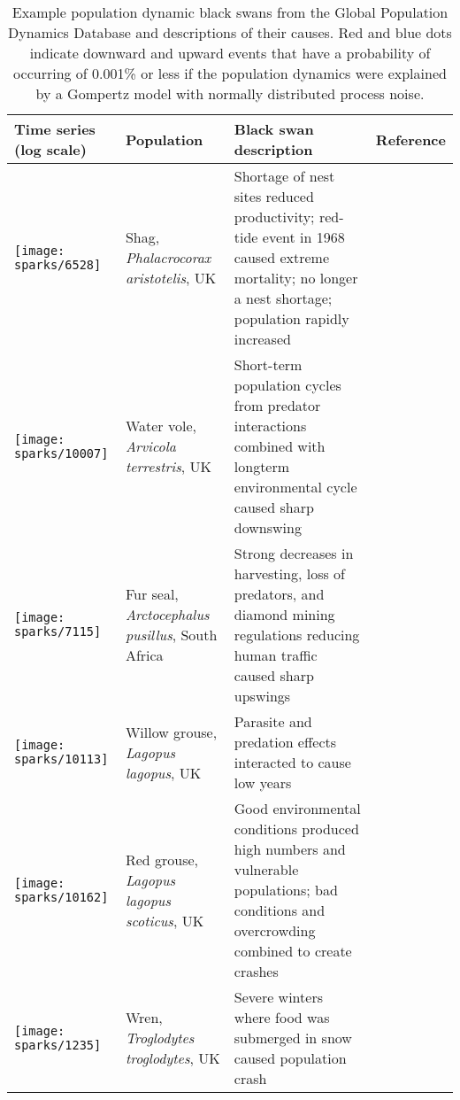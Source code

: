 \documentclass[11pt]{article}
\begin{document}
\begin{small}
\begin{longtable}{>{\RaggedRight}m{2.0cm}>{\RaggedRight}p{3.0cm}>{\RaggedRight}p{7.0cm}>{\RaggedRight}p{2.0cm}}

\caption{Example population dynamic black swans from the Global Population Dynamics Database and descriptions of their causes. Red and blue dots indicate downward and upward events that have a probability of occurring of 0.001\% or less if the population dynamics were explained by a Gompertz model with normally distributed process noise.}\\

\toprule
Time series (log scale) & Population & Black swan description & Reference \\
\midrule

\texttt{[image: sparks/6528]} &
Shag,
\textit{Phalacrocorax aristotelis},
UK &
Shortage of nest sites reduced productivity; red-tide event in 1968 caused extreme mortality; no longer a nest shortage; population rapidly increased &
\citep{potts1980}\\

\texttt{[image: sparks/10007]} &
Water vole,
\textit{Arvicola terrestris},
UK &
Short-term population cycles from predator interactions combined with longterm environmental cycle caused sharp downswing  &
\citep{saucy1994}\\

\texttt{[image: sparks/7115]} &
Fur seal,
\textit{Arctocephalus pusillus},
South Africa &
Strong decreases in harvesting, loss of predators, and diamond mining regulations reducing human traffic caused sharp upswings  &
\citep{shaughnessy1982}\\


\texttt{[image: sparks/10113]} &
Willow grouse,
\textit{Lagopus lagopus},
UK &
Parasite and predation effects interacted to cause low years  &
\citep{dobson1995}\\

\texttt{[image: sparks/10162]} &
Red grouse,
\textit{Lagopus lagopus scoticus},
UK &
Good environmental conditions produced high numbers and vulnerable populations; bad conditions and overcrowding combined to create crashes  &
\citep{mackenzie1952}\\

\texttt{[image: sparks/1235]} &
Wren,
\textit{Troglodytes troglodytes},
UK &
Severe winters where food was submerged in snow caused population crash &
\citep{newton1998} \\


\end{longtable}
\end{small}
\end{document}
